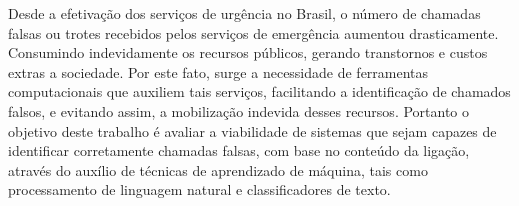 Desde a efetivação dos serviços de urgência no Brasil, o número de chamadas falsas ou trotes recebidos pelos serviços de emergência aumentou drasticamente. Consumindo indevidamente os recursos públicos, gerando transtornos e custos extras a sociedade. Por este fato, surge a necessidade de ferramentas computacionais que auxiliem tais serviços, facilitando a identificação de chamados falsos, e evitando assim, a mobilização indevida desses recursos. Portanto o objetivo deste trabalho é avaliar a viabilidade de sistemas que sejam capazes de identificar corretamente chamadas falsas, com base no conteúdo da ligação, através do auxílio de técnicas de aprendizado de máquina, tais como processamento de linguagem natural e classificadores de texto.

